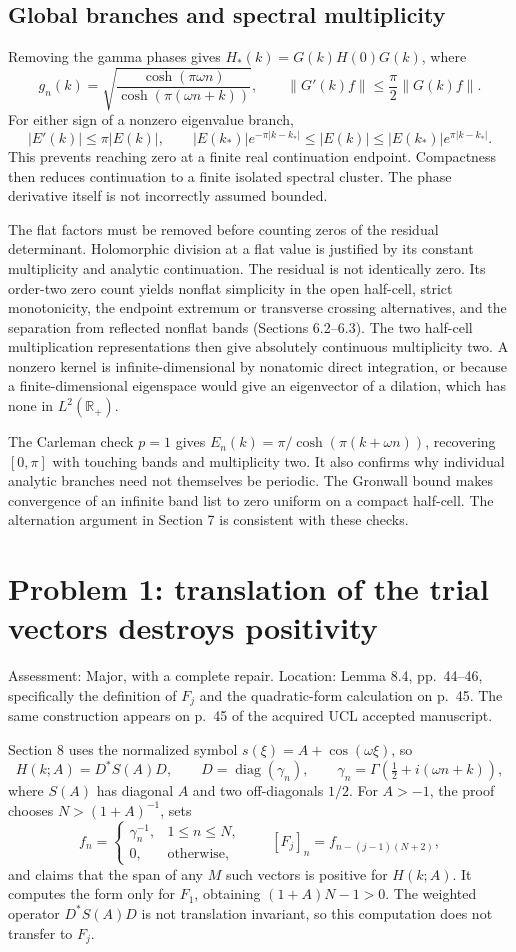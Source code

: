 \documentclass[10pt]{article}
\begin{document}
\subsection*{Global branches and spectral multiplicity}
Removing the gamma phases gives \(H_*(k)=G(k)H(0)G(k)\), where \[g_n(k)=
 \sqrt{\frac{\cosh(\pi\omega n)}{\cosh(\pi(\omega n+k))}},
 \qquad \|G'(k)f\|\le\frac{\pi}{2}\|G(k)f\|.\] For either sign of a nonzero eigenvalue branch, \[|E'(k)|\le\pi|E(k)|,\qquad
 |E(k_*)|e^{-\pi|k-k_*|}
 \le |E(k)|\le |E(k_*)|e^{\pi|k-k_*|}.\] This prevents reaching zero at a finite real continuation endpoint. Compactness then reduces continuation to a finite isolated spectral cluster. The phase derivative itself is not incorrectly assumed bounded.\par
The flat factors must be removed before counting zeros of the residual determinant. Holomorphic division at a flat value is justified by its constant multiplicity and analytic continuation. The residual is not identically zero. Its order-two zero count yields nonflat simplicity in the open half-cell, strict monotonicity, the endpoint extremum or transverse crossing alternatives, and the separation from reflected nonflat bands (Sections 6.2–6.3). The two half-cell multiplication representations then give absolutely continuous multiplicity two. A nonzero kernel is infinite-dimensional by nonatomic direct integration, or because a finite-dimensional eigenspace would give an eigenvector of a dilation, which has none in \(L^2(\mathbb R_+)\).\par
The Carleman check \(p=1\) gives \(E_n(k)=\pi/\cosh(\pi(k+\omega n))\), recovering \([0,\pi]\) with touching bands and multiplicity two. It also confirms why individual analytic branches need not themselves be periodic. The Gronwall bound makes convergence of an infinite band list to zero uniform on a compact half-cell. The alternation argument in Section 7 is consistent with these checks.\par
\section*{Problem 1: translation of the trial vectors destroys positivity}
Assessment: Major, with a complete repair. Location: Lemma 8.4, pp. 44–46, specifically the definition of \(F_j\) and the quadratic-form calculation on p. 45. The same construction appears on p. 45 of the acquired UCL accepted manuscript.\par
Section 8 uses the normalized symbol \(s(\xi)=A+\cos(\omega\xi)\), so \[H(k;A)=D^*S(A)D,\qquad
 D=\operatorname{diag}(\gamma_n),\qquad
 \gamma_n=\Gamma\!\left(\tfrac12+i(\omega n+k)\right),\] where \(S(A)\) has diagonal \(A\) and two off-diagonals \(1/2\). For \(A>-1\), the proof chooses \(N>(1+A)^{-1}\), sets \[f_n=\begin{cases}\gamma_n^{-1},&1\le n\le N,\\0,&\text{otherwise},\end{cases}
 \qquad [F_j]_n=f_{n-(j-1)(N+2)},\] and claims that the span of any \(M\) such vectors is positive for \(H(k;A)\). It computes the form only for \(F_1\), obtaining \((1+A)N-1>0\). The weighted operator \(D^*S(A)D\) is not translation invariant, so this computation does not transfer to \(F_j\).\par
\end{document}
